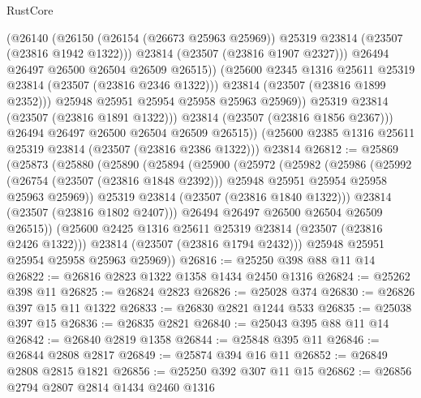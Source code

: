 \begin{lexlean}{RustCore}
\begin{coremodule}
                      (@26140
                        (@26150
                          (@26154 (@26673 @25963 @25969))
                          @25319
                          @23814
                          (@23507 (@23816 @1942 @1322)))
                        @23814
                        (@23507 (@23816 @1907 @2327)))
                      @26494
                      @26497
                      @26500
                      @26504
                      @26509
                      @26515))
                  (@25600 @2345 @1316 @25611 @25319 @23814 (@23507 (@23816 @2346 @1322)))
                  @23814
                  (@23507 (@23816 @1899 @2352)))
                @25948
                @25951
                @25954
                @25958
                @25963
                @25969))
            @25319
            @23814
            (@23507 (@23816 @1891 @1322)))
          @23814
          (@23507 (@23816 @1856 @2367)))
        @26494
        @26497
        @26500
        @26504
        @26509
        @26515))
    (@25600 @2385 @1316 @25611 @25319 @23814 (@23507 (@23816 @2386 @1322)))
    @23814
@26812 := @25869
    (@25873
      (@25880
        (@25890
          (@25894
            (@25900
              (@25972
                (@25982
                  (@25986
                    (@25992
                      (@26754 (@23507 (@23816 @1848 @2392)))
                      @25948
                      @25951
                      @25954
                      @25958
                      @25963
                      @25969))
                  @25319
                  @23814
                  (@23507 (@23816 @1840 @1322)))
                @23814
                (@23507 (@23816 @1802 @2407)))
              @26494
              @26497
              @26500
              @26504
              @26509
              @26515))
          (@25600 @2425 @1316 @25611 @25319 @23814 (@23507 (@23816 @2426 @1322)))
          @23814
          (@23507 (@23816 @1794 @2432)))
        @25948
        @25951
        @25954
        @25958
        @25963
        @25969))
@26816 := @25250 @398 @88 @11 @14
@26822 := @26816 @2823 @1322 @1358 @1434 @2450 @1316
@26824 := @25262 @398 @11
@26825 := @26824 @2823
@26826 := @25028 @374
@26830 := @26826 @397 @15 @11 @1322
@26833 := @26830 @2821 @1244 @533
@26835 := @25038 @397 @15
@26836 := @26835 @2821
@26840 := @25043 @395 @88 @11 @14
@26842 := @26840 @2819 @1358
@26844 := @25848 @395 @11
@26846 := @26844 @2808 @2817
@26849 := @25874 @394 @16 @11
@26852 := @26849 @2808 @2815 @1821
@26856 := @25250 @392 @307 @11 @15
@26862 := @26856 @2794 @2807 @2814 @1434 @2460 @1316

\end{coremodule}
\end{lexlean}
